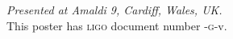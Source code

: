 \documentclass[portrait,plainboxedsections]{sciposter}
\begin{document}
\begin{minipage}[t]{0.7\textwidth}
\newline\newline
\emph{Presented at Amaldi 9, Cardiff, Wales, UK.} \\
This poster has \textsc{ligo} document number \LIGO{}-\textsc{g}-v.

\end{minipage}
\end{document}
